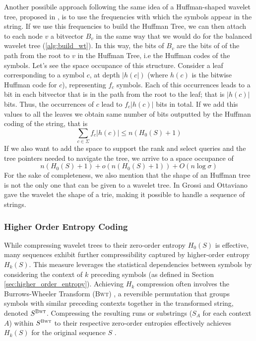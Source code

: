 \noindent Another possibile approach following the same idea of a Huffman-shaped wavelet tree, proposed in \cite{makinen2004new}, is to use the frequencies with which the symbols appear in the string. If we use this frequencies to build the Huffman Tree, we can then attach to each node $v$ a bitvector $B_v$ in the same way that we would do for the balanced wavelet tree (\ref{alg:build_wt}). In this way, the bits of $B_v$ are the bits of of the path from the root to $v$ in the Huffman Tree, i.e the Huffman codes of the symbols. Let's see the space occupance of this structure. Consider a leaf corresponding to a symbol $c$, at depth $|h(c|)$ (where $h(c)$ is the bitwise Huffman code for $c$), representing $f_c$ symbols. Each of this occurrences leads to a bit in each bitvector that is in the path from the root to the leaf; that is $|h(c)|$ bits. Thus, the occurrences of $c$ lead to $f_c |h(c)|$ bits in total. If we add this values to all the leaves we obtain same number of bits outputted by the Huffman coding of the string, that is
\begin{equation}
    \sum_{c \in \Sigma} f_c |h(c)| \leq n(H_0(S) + 1)
\end{equation}
If we also want to add the space to support the rank and select queries and the tree pointers needed to navigate the tree, we arrive to a space occupance of
\begin{equation}
    n(H_0(S) + 1) + o(n(H_0(S) + 1)) + O(n \log \sigma)
\end{equation}
For the sake of completeness, we also mention that the shape of an Huffman tree is not the only one that can be given to a wavelet tree. In \cite{grossi2012wavelet} Grossi and Ottaviano gave the wavelet the shape of a trie, making it possible to handle a sequence of strings.

\subsubsection{Higher Order Entropy Coding}

While compressing wavelet trees to their zero-order entropy $H_0(S)$ is effective, many sequences exhibit further compressibility captured by higher-order entropy $H_k(S)$. This measure leverages the statistical dependencies between symbols by considering the context of $k$ preceding symbols (as defined in Section \ref{sec:higher_order_entropy}). Achieving $H_k$ compression often involves the Burrows-Wheeler Transform (\textsc{Bwt}) \cite{burrows1994block}, a reversible permutation that groups symbols with similar preceding contexts together in the transformed string, denoted $S^{\textsc{Bwt}}$. Compressing the resulting runs or substrings ($S_A$ for each context $A$) within $S^{\textsc{Bwt}}$ to their respective zero-order entropies effectively achieves $H_k(S)$ for the original sequence $S$ \cite{manzini2001analysis}.

